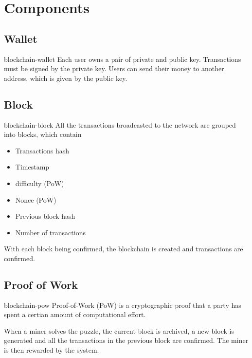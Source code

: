 \documentclass[preview]{standalone}
\begin{document}
\genpage

\section{Components}

\subsection{Wallet}

\begin{snippet}{blockchain-wallet}
Each user owns a pair of private and public key.
Transactions must be signed by the private key. Users
can send their money to another address, which is given by the public key.
\end{snippet}

\subsection{Block}

\begin{snippet}{blockchain-block}
    All the transactions broadcasted to the network are grouped into blocks, which contain

    \begin{itemize}
        \item Transactions hash
        \item Timestamp
        \item difficulty (PoW)
        \item Nonce (PoW)
        \item Previous block hash
        \item Number of transactions
    \end{itemize}

    With each block being confirmed, the blockchain is created
    and transactions are confirmed.
\end{snippet}

\subsection{Proof of Work}

\begin{snippet}{blockchain-pow}
    Proof-of-Work (PoW) is a cryptographic proof that a party has spent
    a certian amount of computational effort.

    When a miner solves the puzzle, the current block is archived, a new
    block is generated and all the transactions in the previous block are confirmed.
    The miner is then rewarded by the system.
\end{snippet}
\end{document}
